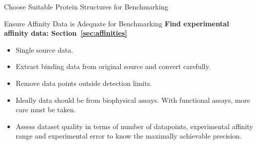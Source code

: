 \documentclass[9pt,bestpractices]{livecoms}
\begin{document}
\begin{Checklists*}
\begin{checklist}{Choose Suitable Protein Structures for Benchmarking}
\begin{itemize}
    \end{itemize}
\end{checklist}

\begin{checklist}{Ensure Affinity Data is Adequate for Benchmarking}
\textbf{Find experimental affinity data: Section~\ref{sec:affinities}}
    \begin{itemize}
    \item Single source data.
    \item Extract binding data from original source and convert carefully.
    \item Remove data points outside detection limits.
    \item Ideally data should be from biophysical assays. With functional assays, more care must be taken.
    \item Assess dataset quality in terms of number of datapoints, experimental affinity range and experimental error to know the maximally achievable precision.
    \end{itemize}
\end{checklist}

\end{Checklists*}
\end{document}

